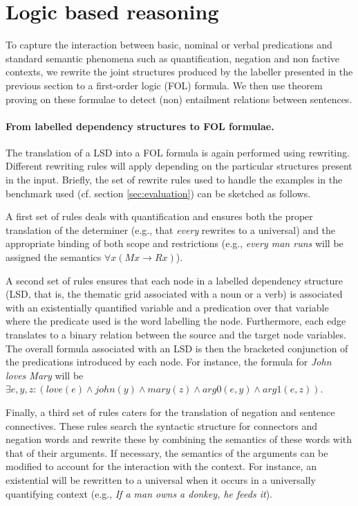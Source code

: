 \documentclass[twocolumn,10pt]{article}
\begin{document}
\section{Logic based reasoning}
\label{sec:logic}
To capture the interaction between basic, nominal or verbal
predications and standard semantic phenomena such as quantification,
negation and non factive contexts, we rewrite the joint structures
produced by the labeller presented in the previous section to a
first-order logic (FOL) formula. We then use theorem proving on these
formulae to detect (non) entailment relations between sentences.

\paragraph{From labelled dependency structures to FOL formulae.}
The translation of a LSD into a FOL formula is again performed using
rewriting. Different rewriting rules will apply depending on the
particular structures present in the input. Briefly, the set of
rewrite rules used to handle the examples in the benchmark used
(cf. section \ref{sec:evaluation}) can be sketched as follows.

A first set of rules deals with quantification and ensures both the
proper translation of the determiner (e.g., that {\it every} rewrites
to a universal) and the appropriate binding of both scope and
restrictions (e.g., {\it every man runs} will be assigned the
semantics $\forall x (Mx \rightarrow Rx)$).

A second set of rules ensures that each node in a labelled dependency
structure (LSD, that is, the thematic grid associated with a noun or a
verb) is associated with an existentially quantified variable and a
predication over that variable where the predicate used is the word
labelling the node. Furthermore, each edge translates to a binary
relation between the source and the target node variables. The overall
formula associated with an LSD is then the bracketed conjunction of
the predications introduced by each node.  For instance, the formula for {\it John loves Mary} will be  $\exists
e,y,z: (love(e) \wedge john(y) \wedge mary(z) \wedge arg0(e,y) \wedge
arg1(e,z))$.

Finally, a third set of rules caters for the translation of negation
and sentence connectives. These rules search the syntactic structure
for connectors and negation words and rewrite these by combining the
semantics of these words with that of their arguments. If necessary,
the semantics of the arguments can be modified to account for the
interaction with the context. For instance, an existential will be
rewritten to a universal when it occurs in a universally quantifying
context (e.g., {\it If a man owns a donkey, he feeds it}).
\end{document}
